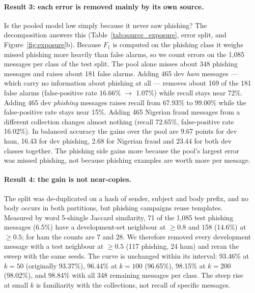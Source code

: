 \documentclass[twoside,11pt]{article}
\begin{document}
\paragraph{Result 3: each error is removed mainly by its own source.} Is the
pooled model low simply because it never saw phishing? The decomposition
answers this (Table~\ref{tab:source_exposure}, error split, and
Figure~\ref{fig:exposure}b). Because $F_1$ is computed on the phishing class
it weighs missed phishing more heavily than false alarms, so we count errors
on the 1{,}085 messages per class of the test split. The pool alone misses
about 348 phishing messages and raises about 181 false alarms. Adding 465
dev \emph{ham} messages --- which carry no information about phishing at all
--- removes about 169 of the 181 false alarms (false-positive rate 16.66\%
$\to$ 1.07\%) while recall stays near 72\%. Adding 465 dev \emph{phishing}
messages raises recall from 67.93\% to 99.00\% while the false-positive rate
stays near 15\%. Adding 465 Nigerian fraud messages from a different
collection changes almost nothing (recall 72.65\%, false-positive rate
16.02\%). In balanced accuracy the gains over the pool are 9.67 points for
dev ham, 16.43 for dev phishing, 2.68 for Nigerian fraud and 23.44 for both
dev classes together. The phishing side gains more because the pool's largest
error was missed phishing, not because phishing examples are worth more per
message.

\paragraph{Result 4: the gain is not near-copies.} The split was
de-duplicated on a hash of sender, subject and body prefix, and no body occurs
in both partitions, but phishing campaigns reuse templates. Measured by word
5-shingle Jaccard similarity, 71 of the 1{,}085 test phishing messages (6.5\%)
have a development-set neighbour at $\geq 0.8$ and 158 (14.6\%) at
$\geq 0.5$; for ham the counts are 7 and 28. We therefore removed every
development message with a test neighbour at $\geq 0.5$ (117 phishing, 24 ham)
and reran the sweep with the same seeds. The curve is unchanged within its
interval: 93.46\% at $k=50$ (originally 93.37\%), 96.44\% at $k=100$ (96.65\%),
98.15\% at $k=200$ (98.02\%), and 98.84\% with all 348 remaining messages per
class. The steep rise at small $k$ is familiarity with the collections, not
recall of specific messages.
\end{document}
